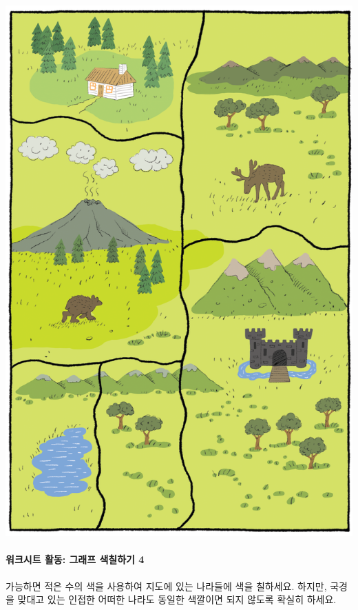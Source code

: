 \documentclass[]{article}
\begin{document}
\includegraphics{csunplugged/04-part/img/ch14-coloring/13-coloring-05-coloring-countries.png}

\mbox{}\paragraph{워크시트 활동: 그래프 색칠하기 4}\label{section-193}

가능하면 적은 수의 색을 사용하여 지도에 있는 나라들에 색을 칠하세요.
하지만, 국경을 맞대고 있는 인접한 어떠한 나라도 동일한 색깔이면 되지
않도록 확실히 하세요.
\end{document}
